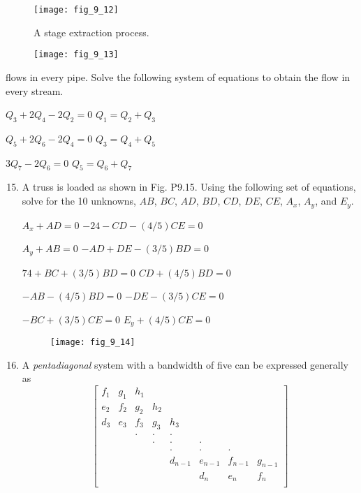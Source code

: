 \documentclass[../main.tex]{subfiles}
\begin{document}
\begin{figure}[H]
	\centering
	\texttt{[image: fig\_9\_12]}
	\caption{\textsf{A stage extraction process.}}
	\label{fig:fig_9_12}
\end{figure}
\pagebreak
\begin{multicols}{2}
	\begin{figure}[H]
		\centering
		\texttt{[image: fig\_9\_13]}
		\caption{}
		\label{fig:fig_9_13}
	\end{figure}
	flows in every pipe. Solve the following system of equations to obtain the flow in every stream.

	$Q_{3}+2Q_{4}-2Q_{2}=0$ \hfill $Q_{1}=Q_{2}+Q_{3}$

	$Q_{5}+2Q_{6}-2Q_{4}=0$ \hfill $Q_{3}=Q_{4}+Q_{5}$

	$3Q_{7}-2Q_{6}=0$ \hfill $Q_{5}=Q_{6}+Q_{7}$
	\begin{enumerate}\setcounter{enumi}{14}
		\item A truss is loaded as shown in Fig. P9.15. Using the following set of equations, solve for the 10 unknowns, $AB$, $BC$, $AD$, $BD$, $CD$, $DE$, $CE$, $A_{x}$, $A_{y}$, and $E_{y}$.

	$A_{x}+AD=0$ \hfill $-24-CD-(4/5)CE=0$

	$A_{y}+AB=0$ \hfill $-AD+DE-(3/5)BD=0$

	$74+BC+(3/5)BD=0$ \hfill $CD+(4/5)BD=0$

	$-AB-(4/5)BD=0$ \hfill $-DE-(3/5)CE=0$

	$-BC+(3/5)CE=0$ \hfill $E_{y}+(4/5)CE=0$
		\begin{figure}[H]
			\centering
			\texttt{[image: fig\_9\_14]}
			\caption{}
			\label{fig:fig_9_14}
		\end{figure}
		\item A \textit{pentadiagonal} system with a bandwidth of five can be expressed generally as
\[\begin{bmatrix}
f_{1} 	& g_{1}	& h_{1}	& 	 		& 	 		& 	 		& 		 	& 		\\
e_{2}	& f_{2} 	& g_{2}	& h_{2}	& 	 		& 	 		& 		 	& 		\\
d_{3} 	& e_{3}	& f_{3} 	& g_{3}	& h_{3}	& 	 		& 		 	& 		\\
	 	& 			& \cdot	& \cdot	& \cdot	& 	 		& 		 	& 		\\
	 	& 			& 	 		& \cdot	& \cdot 	& \cdot	& 		 	& 		\\
	 	& 			& 	 		&			& \cdot	& \cdot	& \cdot 	& 		\\
	 	& 			& 	 		&			& d_{n-1}	& e_{n-1}	& f_{n-1}	&g_{n-1}\\
	 	& 			& 	 		&			& 			& d_{n}	& e_{n} 	&f_{n}	\\
\end{bmatrix}\]


\end{enumerate}
\end{multicols}
\end{document}

